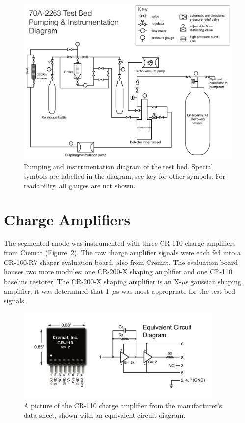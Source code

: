 \begin{figure}[htbp]
\begin{center}
\includegraphics[width=\textwidth]{figures/testbed/full_pid.png}
\caption{Pumping and instrumentation diagram of the test bed. Special symbols are labelled in the diagram, see key for other symbols. For readability, all gauges are not shown.}
\label{fig:circ}
\end{center}
\end{figure}

\section{Charge Amplifiers}
The segmented anode was instrumented with three CR-110 charge amplifiers from Cremat (Figure~\ref{fig:cr110}). The raw charge amplifier signals were each fed into a CR-160-R7 shaper evaluation board, also from Cremat. The evaluation board houses two more modules: one CR-200-X shaping amplifier and one CR-110 baseline restorer. The CR-200-X shaping amplifier is an X-$\mu$s gaussian shaping amplifier; it was determined that 1~$\mu$s was most appropriate for the test bed signals.

\begin{figure}[htbp]
\begin{center}
\includegraphics[width=4in]{figures/testbed/cr110.png}
\caption{A picture of the CR-110 charge amplifier from the manufacturer's data sheet, shown with an equivalent circuit diagram.}
\label{fig:cr110}
\end{center}
\end{figure}

